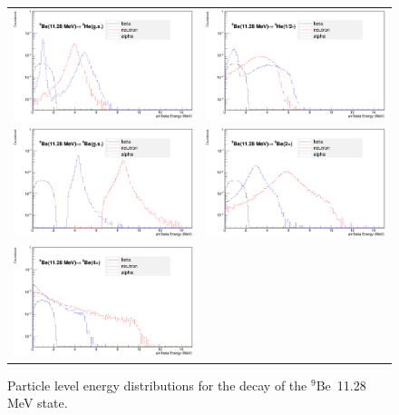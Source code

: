 \documentclass{JINST}
\newcommand{\beNINE}{$^{9}$Be~}
\begin{document}
    \begin{figure}[htp]
     \centering
     
  \begin{tabular}{cc}
    \includegraphics[width=70mm]{a_n_beta_spect_c11.eps} &

      \includegraphics[width=70mm]{a_n_beta_spect_c12.eps} \\

    \includegraphics[width=70mm]{a_n_beta_spect_c13.eps} &
   
   
    \includegraphics[width=70mm]{a_n_beta_spect_c14.eps} \\

    \includegraphics[width=70mm]{a_n_beta_spect_c15.eps}\\
    
    
      \end{tabular}
     \caption{Particle level energy distributions for the decay of the \beNINE 11.28 MeV state.}
    \end{figure}
\end{document}
